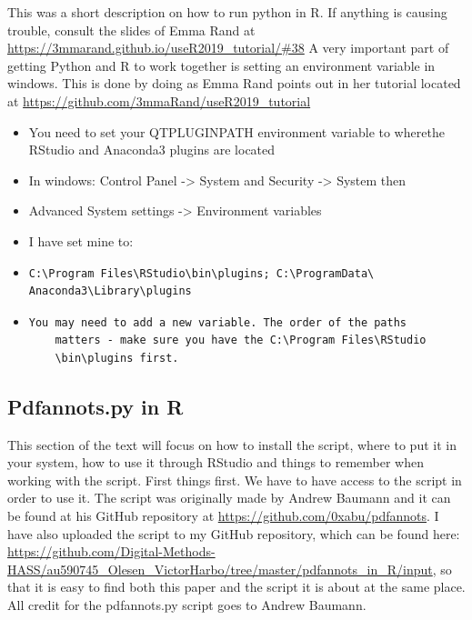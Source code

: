 \documentclass{article}
\begin{document}
This was a short description on how to run python in R. If anything is causing trouble, consult the slides of Emma Rand at \url{https://3mmarand.github.io/useR2019_tutorial/#38} \newline
A very important part of getting Python and R to work together is setting an environment variable in windows. This is done by doing as Emma Rand points out in her tutorial located at \url{https://github.com/3mmaRand/useR2019_tutorial}
\begin{itemize}
    \item You need to set your QT\textunderscore PLUGIN\textunderscore PATH environment variable to wherethe RStudio and Anaconda3 plugins are located
    \item In windows: Control Panel -> System and Security -> System then
    \item Advanced System settings -> Environment variables
    \item I have set mine to:
    \item \begin{verbatim}
C:\Program Files\RStudio\bin\plugins; C:\ProgramData\
Anaconda3\Library\plugins  
    \end{verbatim}
    \item \begin{verbatim}You may need to add a new variable. The order of the paths
    matters - make sure you have the C:\Program Files\RStudio
    \bin\plugins first.
    \end{verbatim}
\end{itemize}

\subsection{Pdfannots.py in R}
This section of the text will focus on how to install the script, where to put it in your system, how to use it through RStudio and things to remember when working with the script. First things first. We have to have access to the script in order to use it. The script was originally made by Andrew Baumann and it can be found at his GitHub repository at \url{https://github.com/0xabu/pdfannots}. I have also uploaded the script to my GitHub repository, which can be found here: \url{https://github.com/Digital-Methods-HASS/au590745_Olesen_VictorHarbo/tree/master/pdfannots_in_R/input}, so that it is easy to find both this paper and the script it is about at the same place. All credit for the pdfannots.py script goes to Andrew Baumann. 
\end{document}
